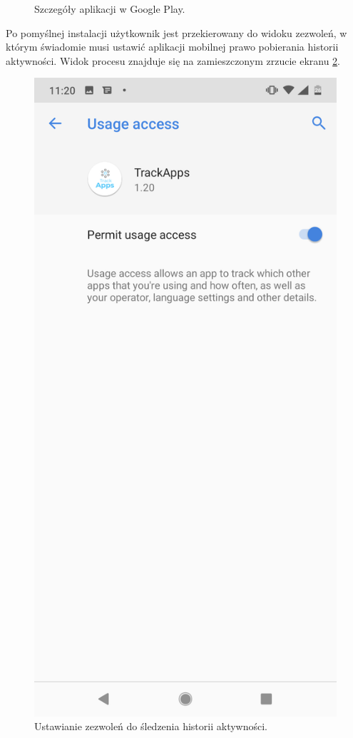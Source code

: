 \documentclass[a4paper,twoside,12pt]{book}
\begin{document}
\begin{description}
\begin{figure}[h!]
    \caption{Szczegóły aplikacji w Google Play.\protect\footnotemark}
    \label{fig:google_play_screen}
\end{figure}

Po pomyślnej instalacji użytkownik jest przekierowany do widoku zezwoleń, w którym świadomie musi ustawić aplikacji mobilnej prawo pobierania historii aktywności. Widok procesu znajduje się na zamieszczonym zrzucie ekranu \ref{fig:usage_access}.

\begin{figure}[h!]
    \centering
    \includegraphics[scale=0.1]{images/usage_access_screen.png}
    \caption{Ustawianie zezwoleń do śledzenia historii aktywności.\protect\footnotemark}
    \label{fig:usage_access}
\end{figure}



\end{description}
\end{document}
